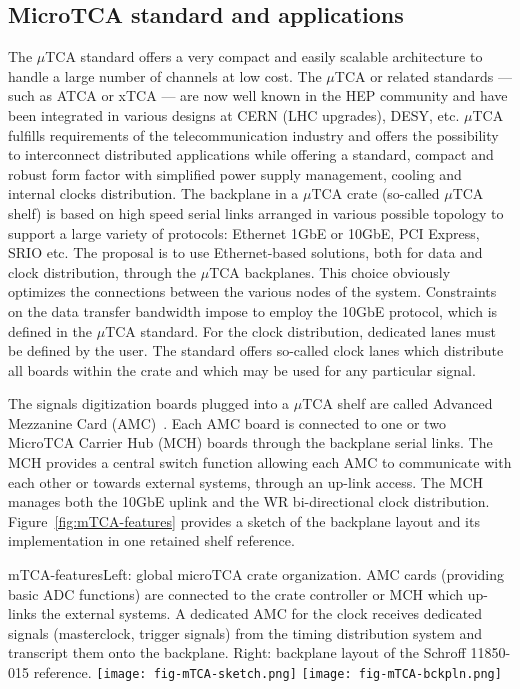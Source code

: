 \subsection{MicroTCA standard and applications}
The $\mu$TCA standard offers a very compact and easily scalable
architecture to handle a large number of channels at low cost. The
$\mu$TCA or related standards --- such as ATCA or xTCA --- are now well
known in the HEP community and have been integrated in various designs
at CERN (LHC upgrades), DESY, etc.  $\mu$TCA fulfills requirements of
the telecommunication industry and offers the possibility to
interconnect distributed applications while offering a standard,
compact and robust form factor with simplified power supply
management, cooling and internal clocks distribution. The backplane in
a $\mu$TCA crate (so-called $\mu$TCA shelf) is based on high speed
serial links arranged in various possible topology to support a large
variety of protocols: Ethernet 1GbE or 10GbE, PCI Express, SRIO
etc. The proposal is to use Ethernet-based solutions, both for data
and clock distribution, through the $\mu$TCA backplanes. This choice
obviously optimizes the connections between the various nodes of the
system. Constraints on the data transfer bandwidth impose to employ
the 10GbE protocol, which is defined in the $\mu$TCA standard. For the
clock distribution, dedicated lanes must be defined by the user. The
standard offers so-called clock lanes which distribute all boards
within the crate and which may be used for any particular signal.

The signals digitization boards plugged into a $\mu$TCA shelf are
called Advanced Mezzanine Card (AMC)~\cite{picmg-2006}. Each AMC board
is connected to one or two MicroTCA Carrier Hub (MCH) boards through
the backplane serial links. The MCH provides a central switch function
allowing each AMC to communicate with each other or towards external
systems, through an up-link access. The MCH manages both the 10GbE
uplink and the WR bi-directional clock distribution.
Figure~\ref{fig:mTCA-features} provides a sketch of the backplane
layout and its implementation in one retained shelf reference.
\begin{cdrfigure}{mTCA-features}{\small Left: global microTCA crate organization. AMC cards (providing basic ADC functions) are connected to the crate controller or MCH which up-links the external systems. A dedicated AMC for the clock receives dedicated signals (masterclock, trigger signals) from the timing distribution system and transcript them onto the backplane. Right: backplane layout of the Schroff 11850-015 reference.}
\texttt{[image: fig-mTCA-sketch.png]}\hfill
\texttt{[image: fig-mTCA-bckpln.png]}
\end{cdrfigure}


